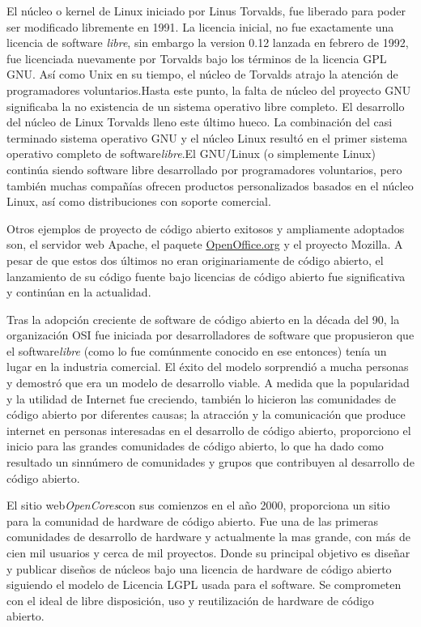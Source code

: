 	El núcleo o kernel de Linux iniciado por Linus Torvalds, fue liberado para poder ser modificado libremente en 1991. La licencia inicial, no fue
	exactamente una licencia de software \textit{libre}, sin embargo la version 0.12 lanzada en febrero de 1992, fue licenciada nuevamente por Torvalds
	bajo los términos de la licencia GPL GNU. Así como Unix en su tiempo, el núcleo de Torvalds atrajo la atención de programadores voluntarios.Hasta
	este punto, la falta de núcleo del proyecto GNU				significaba la no existencia de un sistema operativo libre completo. El desarrollo del núcleo de
	Linux Torvalds lleno este último hueco. La combinación del casi terminado sistema operativo GNU y el núcleo Linux resultó en el primer sistema
	operativo completo de software\textit{libre}.El GNU/Linux (o simplemente Linux) continúa siendo software libre desarrollado por programadores
	voluntarios, pero también muchas compañías ofrecen productos personalizados basados en el núcleo Linux, así como distribuciones con soporte
	comercial.

	Otros ejemplos de proyecto de código abierto exitosos y ampliamente adoptados son, el servidor web Apache, el paquete \url{OpenOffice.org} y el
	proyecto Mozilla. A pesar de que estos dos últimos no eran originariamente de código abierto, el lanzamiento de su código fuente bajo licencias de
	código abierto fue significativa y continúan en la actualidad.
	
	Tras la adopción creciente de software de código abierto en la década del 90, la organización OSI fue iniciada por desarrolladores de software que
	propusieron que el software\textit{libre} (como lo fue comúnmente conocido en ese entonces) tenía un lugar en la industria comercial. El éxito
	del modelo sorprendió a mucha personas y demostró que era un modelo de desarrollo viable. A medida que la popularidad y la utilidad de Internet fue
	creciendo, también lo hicieron las comunidades de código abierto por diferentes causas; la atracción y la comunicación que produce internet en
	personas interesadas en el desarrollo de código abierto, proporciono el inicio para las grandes comunidades de código abierto, lo que ha dado como
	resultado un sinnúmero de comunidades y grupos que contribuyen al desarrollo de código abierto.

	El sitio web\textit{OpenCores}con sus comienzos en el año 2000, proporciona un sitio para la comunidad de hardware de código abierto.
 	Fue una de las primeras comunidades de desarrollo de hardware y actualmente la mas grande, con más de cien mil usuarios y cerca de mil proyectos.
 	Donde su principal objetivo es diseñar y publicar diseños de núcleos bajo una licencia de hardware de código abierto siguiendo el modelo de
 	Licencia LGPL usada para el software. Se comprometen con el ideal de libre disposición, uso y reutilización de hardware de código
 	abierto.\cite{Etiqueta10}

